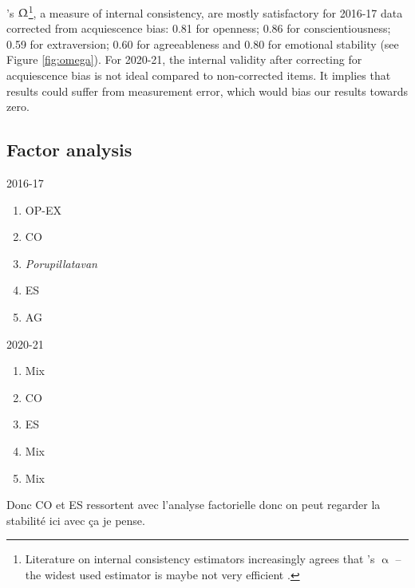 \documentclass[a4paper, 12pt, onecolumn]{article}
\begin{document}
\citeauthor{McDonald1999}'s $\Upomega$\footnote{Literature on internal consistency estimators increasingly agrees that \citeauthor{Cronbach1951}'s $\upalpha$ --the widest used estimator is maybe not very efficient \citep{Bourque2019, TrizanoHermosilla2016}.}, a measure of internal consistency, are mostly satisfactory for 2016-17 data corrected from acquiescence bias: 0.81 for openness; 0.86 for conscientiousness; 0.59 for extraversion; 0.60 for agreeableness and 0.80 for emotional stability (see Figure \ref{fig:omega}).
For 2020-21, the internal validity after correcting for acquiescence bias is not ideal compared to non-corrected items.
It implies that results could suffer from measurement error, which would bias our results towards zero.



	\subsection{Factor analysis}

2016-17
\begin{enumerate}
\item OP-EX
\item CO
\item \textit{Porupillatavan}
\item ES
\item AG
\end{enumerate}

2020-21
\begin{enumerate}
\item Mix
\item CO
\item ES
\item Mix
\item Mix
\end{enumerate}

Donc CO et ES ressortent avec l'analyse factorielle donc on peut regarder la stabilité ici avec ça je pense.






\clearpage
\newpage
%

\end{document}
